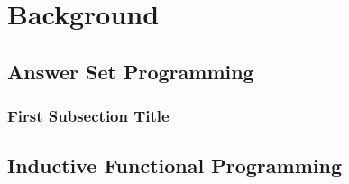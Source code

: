 \chapter{Background}

\section{Answer Set Programming}

\lipsum[1-2]\cite{Cooper13}

\subsection{First Subsection Title}

\lipsum[3]

\section{Inductive Functional Programming}

\lipsum[4-5]


\pagebreak
\renewcommand\bibname{{References}}

